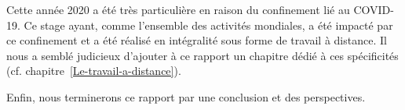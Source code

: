 Cette année 2020 a été très particulière en raison du confinement lié au
COVID-19. Ce stage ayant, comme l'ensemble des activités mondiales, a été
impacté par ce confinement et a été réalisé en intégralité sous forme de
travail à distance. Il nous a semblé judicieux d'ajouter à ce rapport un
chapitre dédié à ces spécificités (cf. chapitre~\ref{Le-travail-a-distance}).

Enfin, nous terminerons ce rapport par une conclusion et des perspectives.
